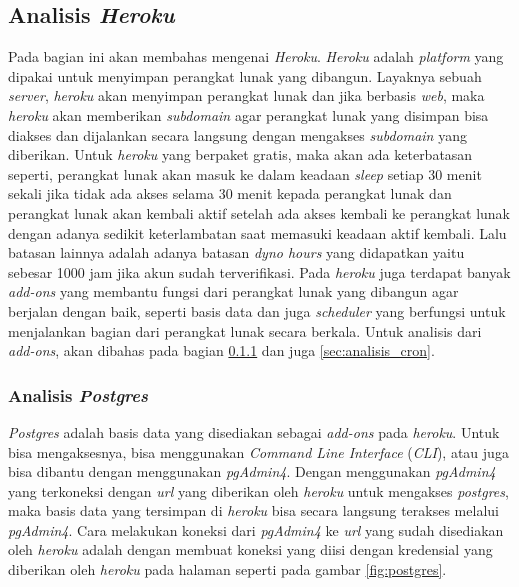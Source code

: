 \subsection{Analisis \textit{Heroku}}
\label{sec:analisis_heroku}
Pada bagian ini akan membahas mengenai \textit{Heroku}. \textit{Heroku} adalah \textit{platform} yang dipakai untuk menyimpan perangkat lunak yang dibangun. Layaknya sebuah \textit{server}, \textit{heroku} akan menyimpan perangkat lunak dan jika berbasis \textit{web}, maka \textit{heroku} akan memberikan \textit{subdomain} agar perangkat lunak yang disimpan bisa diakses dan dijalankan secara langsung dengan mengakses \textit{subdomain} yang diberikan. Untuk \textit{heroku} yang berpaket gratis, maka akan ada keterbatasan seperti, perangkat lunak akan masuk ke dalam keadaan \textit{sleep} setiap 30 menit sekali jika tidak ada akses selama 30 menit kepada perangkat lunak dan perangkat lunak akan kembali aktif setelah ada akses kembali ke perangkat lunak dengan adanya sedikit keterlambatan saat memasuki keadaan aktif kembali. Lalu batasan lainnya adalah adanya batasan \textit{dyno hours} yang didapatkan yaitu sebesar 1000 jam jika akun sudah terverifikasi. Pada \textit{heroku} juga terdapat banyak \textit{add-ons} yang membantu fungsi dari perangkat lunak yang dibangun agar berjalan dengan baik, seperti basis data dan juga \textit{scheduler} yang berfungsi untuk menjalankan bagian dari perangkat lunak secara berkala. Untuk analisis dari \textit{add-ons}, akan dibahas pada bagian \ref{sec:analisis_postgres} dan juga \ref{sec:analisis_cron}. 

\subsubsection{Analisis \textit{Postgres}}
\label{sec:analisis_postgres}
\textit{Postgres} adalah basis data yang disediakan sebagai \textit{add-ons} pada \textit{heroku}. Untuk bisa mengaksesnya, bisa menggunakan \textit{Command Line Interface} (\textit{CLI}), atau juga bisa dibantu dengan menggunakan \textit{pgAdmin4}. Dengan menggunakan \textit{pgAdmin4} yang terkoneksi dengan \textit{url} yang diberikan oleh \textit{heroku} untuk mengakses \textit{postgres}, maka basis data yang tersimpan di \textit{heroku} bisa secara langsung terakses melalui \textit{pgAdmin4}. Cara melakukan koneksi dari \textit{pgAdmin4} ke \textit{url} yang sudah disediakan oleh \textit{heroku} adalah dengan membuat koneksi yang diisi dengan kredensial yang diberikan oleh \textit{heroku} pada halaman seperti pada gambar \ref{fig:postgres}. 

